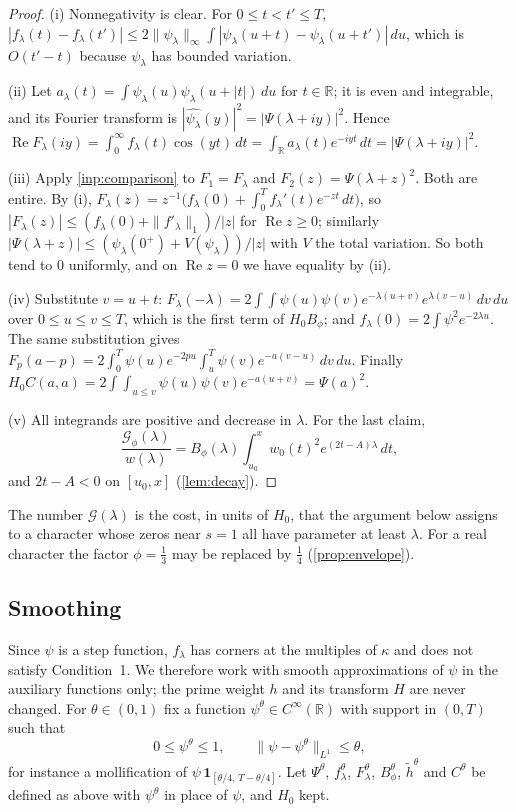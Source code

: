 \documentclass[11pt]{amsart}
\numberwithin{equation}{section}
\theoremstyle{plain}
\theoremstyle{definition}
\theoremstyle{remark}
\newcommand{\RR}{\mathbb{R}}
\renewcommand{\Re}{\operatorname{Re}}
\newcommand{\1}{\mathbf{1}}
\begin{document}
\begin{proof}
(i) Nonnegativity is clear. For $0\le t<t'\le T$,
$|f_\lambda(t)-f_\lambda(t')|\le2\|\psi_\lambda\|_\infty\int|\psi_\lambda(u+t)-\psi_\lambda(u+t')|\,du$,
which is $O(t'-t)$ because $\psi_\lambda$ has bounded variation.

(ii) Let $a_\lambda(t)=\int\psi_\lambda(u)\psi_\lambda(u+|t|)\,du$ for $t\in\RR$; it is even and
integrable, and its Fourier transform is $|\widehat{\psi_\lambda}(y)|^2=|\Psi(\lambda+iy)|^2$.
Hence $\Re F_\lambda(iy)=\int_0^\infty f_\lambda(t)\cos(yt)\,dt=\int_\RR a_\lambda(t)e^{-iyt}\,dt
=|\Psi(\lambda+iy)|^2$.

(iii) Apply \cref{inp:comparison} to $F_1=F_\lambda$ and $F_2(z)=\Psi(\lambda+z)^2$. Both are
entire. By (i), $F_\lambda(z)=z^{-1}\bigl(f_\lambda(0)+\int_0^Tf_\lambda'(t)e^{-zt}\,dt\bigr)$, so
$|F_\lambda(z)|\le(f_\lambda(0)+\|f'_\lambda\|_1)/|z|$ for $\Re z\ge0$; similarly
$|\Psi(\lambda+z)|\le(\psi_\lambda(0^+)+V(\psi_\lambda))/|z|$ with $V$ the total variation. So both tend to
$0$ uniformly, and on $\Re z=0$ we have equality by (ii).

(iv) Substitute $v=u+t$:
$F_\lambda(-\lambda)=2\int\!\!\int\psi(u)\psi(v)e^{-\lambda(u+v)}e^{\lambda(v-u)}\,dv\,du$ over $0\le u\le v\le T$,
which is the first term of $H_0B_\phi$; and $f_\lambda(0)=2\int\psi^2e^{-2\lambda u}$. The same
substitution gives $F_p(a-p)=2\int_0^T\psi(u)e^{-2pu}\int_u^T\psi(v)e^{-a(v-u)}\,dv\,du$. Finally
$H_0C(a,a)=2\int\!\!\int_{u\le v}\psi(u)\psi(v)e^{-a(u+v)}=\Psi(a)^2$.

(v) All integrands are positive and decrease in $\lambda$. For the last claim,
\[
  \frac{\mathcal G_\phi(\lambda)}{w(\lambda)}=B_\phi(\lambda)\int_{u_0}^xw_0(t)^2e^{(2t-A)\lambda}\,dt,
\]
and $2t-A<0$ on $[u_0,x]$ (\cref{lem:decay}).
\end{proof}

The number $\mathcal G(\lambda)$ is the cost, in units of $H_0$, that the argument below assigns to a
character whose zeros near $s=1$ all have parameter at least $\lambda$. For a real character
the factor $\phi=\frac13$ may be replaced by $\frac14$ (\cref{prop:envelope}).

\subsection{Smoothing}\label{subsec:smoothing}
Since $\psi$ is a step function, $f_\lambda$ has corners at the multiples of $\kappa$ and does
not satisfy Condition~1. We therefore work with smooth approximations of $\psi$ in the
auxiliary functions only; the prime weight $h$ and its transform $H$ are never changed. For
$\theta\in(0,1)$ fix a function $\psi^\theta\in C^\infty(\RR)$ with support in $(0,T)$ such that
\[
  0\le\psi^\theta\le1,\qquad\|\psi-\psi^\theta\|_{L^1}\le\theta,
\]
for instance a mollification of $\psi\,\1_{[\theta/4,\,T-\theta/4]}$. Let $\Psi^\theta$,
$f^\theta_\lambda$, $F^\theta_\lambda$, $B^\theta_\phi$, $\tilde h^\theta$ and $C^\theta$ be defined as above
with $\psi^\theta$ in place of $\psi$, and $H_0$ kept.
\end{document}
